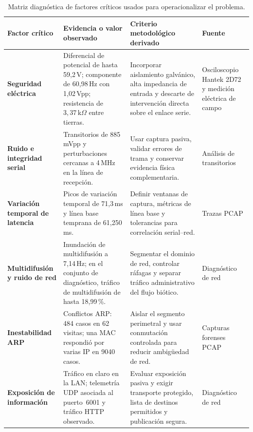 \begingroup
\scriptsize
\setlength{\tabcolsep}{2pt}
\renewcommand{\arraystretch}{1.08}
\begin{longtable}{|>{\raggedright\arraybackslash}p{2.85cm}|>{\raggedright\arraybackslash}p{3.60cm}|>{\raggedright\arraybackslash}p{6.60cm}|>{\raggedright\arraybackslash}p{2.75cm}|}
\caption{Matriz diagnóstica de factores críticos usados para operacionalizar el problema.}
\label{tab:matriz_problematica}\\
\hline
\rowcolor{gray!20} \centering\arraybackslash\textbf{Factor crítico} & \centering\arraybackslash\textbf{Evidencia o valor observado} & \centering\arraybackslash\textbf{Criterio metodológico derivado} & \centering\arraybackslash\textbf{Fuente} \\ \hline
\endfirsthead
\endhead
\hline
\endfoot
\textbf{Seguridad eléctrica} & Diferencial de potencial de hasta 59,2\,V; componente de 60,98\,Hz con 1,02\,Vpp; resistencia de $3{,}37\,\text{k}\Omega$ entre tierras. & Incorporar aislamiento galvánico, alta impedancia de entrada y descarte de intervención directa sobre el enlace serie. & Osciloscopio Hantek 2D72 y medición eléctrica de campo \\ \hline
\textbf{Ruido e integridad serial} & Transitorios de 885\,mVpp y perturbaciones cercanas a 4\,MHz en la línea de recepción. & Usar captura pasiva, validar errores de trama y conservar evidencia física complementaria. & Análisis de transitorios \\ \hline
\textbf{Variación temporal de latencia} & Picos de variación temporal de 71,3\,ms y línea base temprana de 61,250\,ms. & Definir ventanas de captura, métricas de línea base y tolerancias para correlación serial--red. & Trazas \acs{PCAP} \\ \hline
\textbf{Multidifusión y ruido de red} & Inundación de multidifusión a 7,14\,Hz; en el conjunto de diagnóstico, tráfico de multidifusión de hasta 18,99\,\%. & Segmentar el dominio de red, controlar ráfagas y separar tráfico administrativo del flujo biótico. & Diagnóstico de red\\ \hline
\textbf{Inestabilidad \acs{ARP}} & Conflictos \acs{ARP}: 484 casos en 62 visitas; una \acs{MAC} respondió por varias \acs{IP} en 9040 casos. & Aislar el segmento perimetral y usar conmutación controlada para reducir ambigüedad de red. & Capturas forenses \acs{PCAP} \\ \hline
\textbf{Exposición de información} & Tráfico en claro en la \ac{LAN}; telemetría \ac{UDP} asociada al puerto~6001 y tráfico HTTP observado. & Evaluar exposición pasiva y exigir transporte protegido, lista de destinos permitidos y publicación segura. & Diagnóstico de red\\ \hline

\end{longtable}
